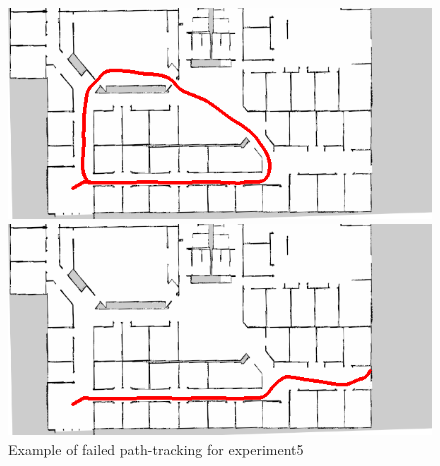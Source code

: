 \begin{figure}[h]
  \begin{minipage}[b]{0.45\linewidth}
    \centering
    \includegraphics[keepaspectratio, scale=0.33]{images/mazemaze/traject1.png}
    \subcaption{}
  \end{minipage}
  \begin{minipage}[b]{0.45\linewidth}
    \centering
    \includegraphics[keepaspectratio, scale=0.33]{images/mazemaze/traject8.png}
    \subcaption{}
  \end{minipage}
\caption{Example of failed path-tracking for experiment5}
\label{Fig:fail5}
\end{figure}

